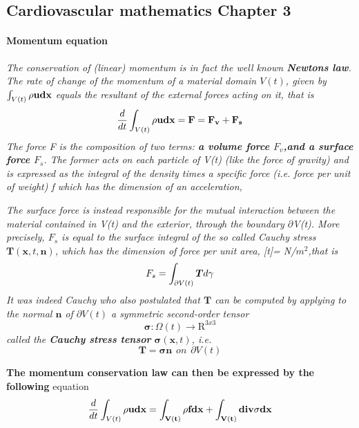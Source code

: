 \documentclass[11pt,letterpaper]{article}
\begin{document}
\subsection{Cardiovascular mathematics Chapter 3}

\paragraph{Momentum equation}
\textit{The conservation of (linear) momentum is in fact the well known \textbf{Newtons law}. The rate of change of the momentum of a material domain $V(t)$, given by $\int_{V(t)} \rho \bf{u} d\bf{x} $ equals the resultant of the external forces acting on it, that is \begin{equation}
   \frac{d}{dt} \int_{V(t)} \rho \bf{u} d\bf{x} = \bm{F} = \bm{F_v} + \bm{F_s}
\end{equation}
The force F is the composition of two terms:\textbf{ a volume force $F_v$,and a surface force $F_s$}. The former acts on each particle of V(t) (like the force of gravity) and is expressed as the integral of the density times a specific force (i.e. force per unit of weight) f which has the dimension of an acceleration,}

\textit{The surface force is instead responsible for the mutual interaction between the material contained in V(t) and the exterior, through the boundary $\partial$V(t). More precisely, $F_s$ is equal to the surface integral of the so called Cauchy
stress $\bm{T}(\bm{x}, t, \bm{n})$, which has the dimension of force per unit area, [t]= N/$m^2$,that is
\begin{equation}
    F_s =  \int_{\partial V(t)} \bm{T} d\bf{\gamma}
\end{equation}
It was indeed Cauchy who also postulated that $\bm{T}$ can be computed by
applying to the normal $\bm{n}$ of $\partial V(t)$ a symmetric second-order tensor
\begin{equation}
    \bm{\sigma} : \Omega(t) \longrightarrow \mathrm{R}^{3x3}
\end{equation}
called the \textbf{Cauchy stress tensor} $\bm{\sigma}(\bm{x},t)$, i.e.
\begin{equation}
    \bm{T} = \bm{\sigma}\bm{n} \hspace{5pt} on \hspace{5pt}  \partial V(t)
\end{equation}
}

{\color{red}\textbf{The momentum conservation law can then be expressed by the following}}
equation \begin{equation}
     \frac{d}{dt} \int_{V(t)} \rho \bf{u} d\bf{x} = \int_{V(t)} \rho \bf{f} d\bf{x} + \int_{V(t)} div \bf{\sigma} d\bf{x}
\end{equation}
\end{document}
